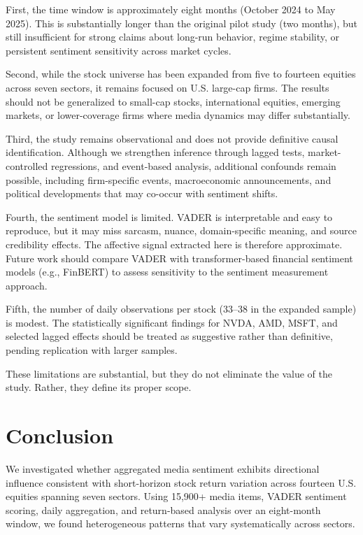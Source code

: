 \documentclass[lettersize,journal]{IEEEtran}
\begin{document}
First, the time window is approximately eight months (October 2024 to May 2025). This is substantially longer than the original pilot study (two months), but still insufficient for strong claims about long-run behavior, regime stability, or persistent sentiment sensitivity across market cycles.

Second, while the stock universe has been expanded from five to fourteen equities across seven sectors, it remains focused on U.S. large-cap firms. The results should not be generalized to small-cap stocks, international equities, emerging markets, or lower-coverage firms where media dynamics may differ substantially.

Third, the study remains observational and does not provide definitive causal identification. Although we strengthen inference through lagged tests, market-controlled regressions, and event-based analysis, additional confounds remain possible, including firm-specific events, macroeconomic announcements, and political developments that may co-occur with sentiment shifts.

Fourth, the sentiment model is limited. VADER is interpretable and easy to reproduce, but it may miss sarcasm, nuance, domain-specific meaning, and source credibility effects. The affective signal extracted here is therefore approximate. Future work should compare VADER with transformer-based financial sentiment models (e.g., FinBERT) to assess sensitivity to the sentiment measurement approach.

Fifth, the number of daily observations per stock (33--38 in the expanded sample) is modest. The statistically significant findings for NVDA, AMD, MSFT, and selected lagged effects should be treated as suggestive rather than definitive, pending replication with larger samples.

These limitations are substantial, but they do not eliminate the value of the study. Rather, they define its proper scope.

\section{Conclusion}
\label{sec:conclusion}
We investigated whether aggregated media sentiment exhibits directional influence consistent with short-horizon stock return variation across fourteen U.S. equities spanning seven sectors. Using 15{,}900+ media items, VADER sentiment scoring, daily aggregation, and return-based analysis over an eight-month window, we found heterogeneous patterns that vary systematically across sectors.
\end{document}
